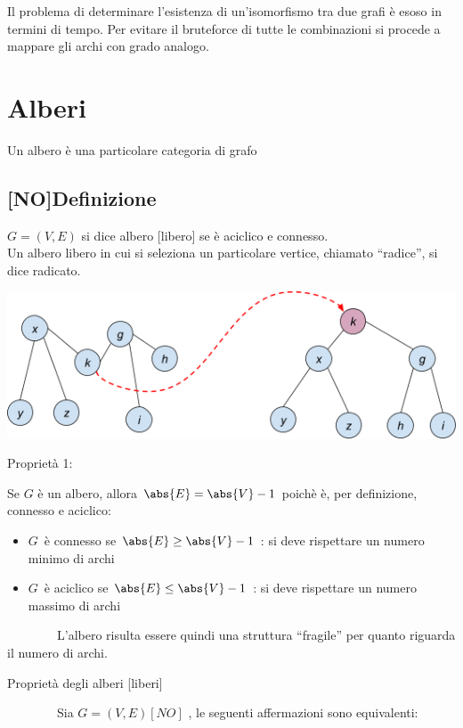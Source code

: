 \documentclass{article}
\providecommand{\tightlist}{%
  \setlength{\itemsep}{0pt}\setlength{\parskip}{0pt}}
\begin{document}
{{{}

{Il problema di determinare l'esistenza di un'isomorfismo tra due grafi è esoso in termini di tempo. Per evitare il bruteforce di tutte le combinazioni si procede a mappare gli archi con grado analogo.}

\hypertarget{h.jnoiha3cadu8}{\section{\texorpdfstring{{Alberi}}{Alberi}}\label{h.jnoiha3cadu8}}

{Un albero è una particolare categoria di grafo}

\subsection{{[}NO{]}Definizione}

$G=(V,E)$ si dice albero {[}libero{]} se è aciclico e connesso.\\
Un albero libero in cui si seleziona un particolare vertice, chiamato ``radice'', si dice radicato.

{\includegraphics{images/image533.png}}

{Proprietà 1:}

Se $G$ è un albero, allora $\abs{E} = \abs{V} - 1$ poichè è, per definizione, connesso e aciclico:

\begin{itemize}
\tightlist
\item
  $G${~è connesso se $\abs{E} \geq \abs{V} - 1$ : si deve rispettare un numero minimo di archi}
\item
  $G${~è aciclico se $\abs{E} \leq \abs{V} - 1$ : si deve rispettare un numero massimo di archi}
\end{itemize}

{~~~~~~~~L'albero risulta essere quindi una struttura ``fragile'' per
quanto riguarda il numero di archi.}

{Proprietà degli alberi {[}liberi{]}}

{~~~~~~~~Sia }$G=(V,E) [NO]$ {, le seguenti affermazioni sono equivalenti:}

}}
\end{document}
